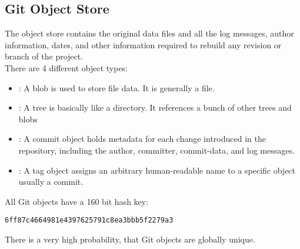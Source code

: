 %

\subsection{Git Object Store}
The object store contains the original data files and all the log
messages, author information, dates, and other information required to
rebuild any revision or branch of the project.\\
There are 4 different object types:
\begin{itemize}
\item {}: A blob is used to store file data. It is generally a file.
\item {}: A tree is basically like a directory.
It references a bunch of other trees and blobs
\item {}: A commit object holds metadata for each change
introduced in the repository, including the author, committer, commit-data,
and log messages.
\item {}: A tag object assigns an arbitrary human-readable
name to a specific object usually a commit.
\end{itemize}
All Git objects have a 160 bit hash key:
\begin{lstlisting}
6ff87c4664981e4397625791c8ea3bbb5f2279a3
\end{lstlisting}
There is a very high probability, that Git objects are globally unique.\\

\vspace{3mm}


